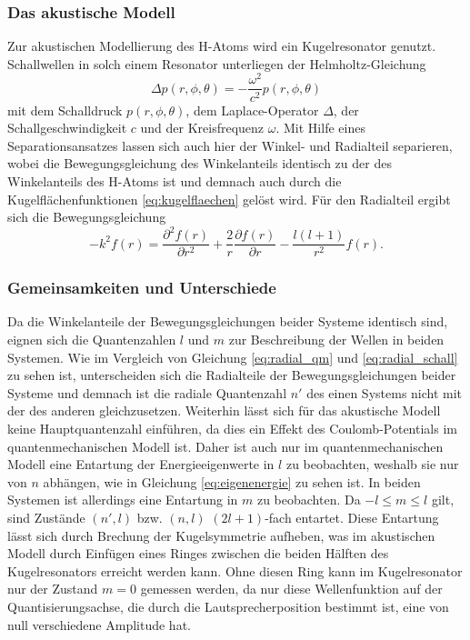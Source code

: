 \subsubsection{Das akustische Modell}
Zur akustischen Modellierung des H-Atoms wird ein Kugelresonator genutzt.
Schallwellen in solch einem Resonator unterliegen der Helmholtz-Gleichung
\begin{equation*}
  \Delta p \left(r, \phi, \theta \right) = - \frac{\omega^2}{c^2} p \left(r, \phi, \theta \right)
\end{equation*}
mit dem Schalldruck $p\left(r, \phi, \theta \right)$, dem Laplace-Operator $\Delta$, der Schallgeschwindigkeit $c$ und der Kreisfrequenz $\omega$.
Mit Hilfe eines Separationsansatzes lassen sich auch hier der Winkel- und Radialteil separieren, wobei die Bewegungsgleichung des Winkelanteils identisch zu der des Winkelanteils des H-Atoms ist und demnach auch durch die Kugelflächenfunktionen \eqref{eq:kugelflaechen} gelöst wird. Für den Radialteil ergibt sich die Bewegungsgleichung
\begin{equation}
  - k^2 f(r) = \frac{\partial^2 f(r)}{\partial r^2} + \frac{2}{r} \frac{\partial f(r)}{\partial r} - \frac{l (l+1)}{r^2} f(r).
  \label{eq:radial_schall}
\end{equation}

\subsubsection{Gemeinsamkeiten und Unterschiede}
Da die Winkelanteile der Bewegungsgleichungen beider Systeme identisch sind, eignen sich die Quantenzahlen $l$ und $m$ zur Beschreibung der Wellen in beiden Systemen.
Wie im Vergleich von Gleichung \eqref{eq:radial_qm} und \eqref{eq:radial_schall} zu sehen ist, unterscheiden sich die Radialteile der Bewegungsgleichungen beider Systeme und demnach ist die radiale Quantenzahl $n'$ des einen Systems nicht mit der des anderen gleichzusetzen.
Weiterhin lässt sich für das akustische Modell keine Hauptquantenzahl einführen, da dies ein Effekt des Coulomb-Potentials im quantenmechanischen Modell ist.
Daher ist auch nur im quantenmechanischen Modell eine Entartung der Energieeigenwerte in $l$ zu beobachten, weshalb sie nur von $n$ abhängen, wie in Gleichung \eqref{eq:eigenenergie} zu sehen ist. In beiden Systemen ist allerdings eine Entartung in $m$ zu beobachten. Da $-l \leq m \leq l$ gilt, sind Zustände $(n', l)$ bzw. $(n, l)$ $(2l+1)$-fach entartet. Diese Entartung lässt sich durch Brechung der Kugelsymmetrie aufheben, was im akustischen Modell durch Einfügen eines Ringes zwischen die beiden Hälften des Kugelresonators erreicht werden kann. Ohne diesen Ring kann im Kugelresonator nur der Zustand $m=0$ gemessen werden, da nur diese Wellenfunktion auf der Quantisierungsachse, die durch die Lautsprecherposition bestimmt ist, eine von null verschiedene Amplitude hat.

